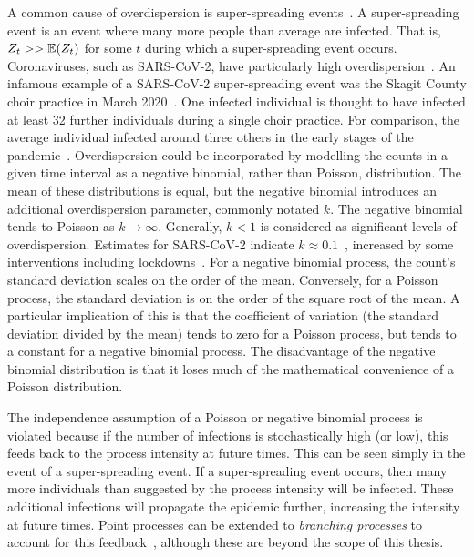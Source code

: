 \documentclass[thesis.tex]{subfiles}
\begin{document}
A common cause of overdispersion is super-spreading events~\autocite{lloyd-smithSuperspreading}.
A super-spreading event is an event where many more people than average are infected.
That is, $Z_t >> \operatorname{\mathbb{E}}(Z_t)$ for some $t$ during which a super-spreading event occurs.
Coronaviruses, such as SARS-CoV-2, have particularly high overdispersion~\autocites{endoEstimating}{adamClustering}{mccloskeySARS}.
An infamous example of a SARS-CoV-2 super-spreading event was the Skagit County choir practice in March 2020~\autocite{hamnerHigh}.
One infected individual is thought to have infected at least 32 further individuals during a single choir practice.
For comparison, the average individual infected around three others in the early stages of the pandemic~\autocite{pellisChallenges}. 
Overdispersion could be incorporated by modelling the counts in a given time interval as a negative binomial, rather than Poisson, distribution.
The mean of these distributions is equal, but the negative binomial introduces an additional overdispersion parameter, commonly notated $k$.
The negative binomial tends to Poisson as $k\to\infty$.
Generally, $k<1$ is considered as significant levels of overdispersion.
Estimates for SARS-CoV-2 indicate $k \approx 0.1$~\autocite{endoEstimating}, increased by some interventions including lockdowns~\autocites{quiltyReconstructing}{quiltyUnderstanding}.
For a negative binomial process, the count's standard deviation scales on the order of the mean.
Conversely, for a Poisson process, the standard deviation is on the order of the square root of the mean.
A particular implication of this is that the coefficient of variation (the standard deviation divided by the mean) tends to zero for a Poisson process, but tends to a constant for a negative binomial process.
The disadvantage of the negative binomial distribution is that it loses much of the mathematical convenience of a Poisson distribution.

The independence assumption of a Poisson or negative binomial process is violated because if the number of infections is stochastically high (or low), this feeds back to the process intensity at future times.
This can be seen simply in the event of a super-spreading event.
If a super-spreading event occurs, then many more individuals than suggested by the process intensity will be infected.
These additional infections will propagate the epidemic further, increasing the intensity at future times.
Point processes can be extended to \emph{branching processes} to account for this feedback~\autocite[246]{yanDistribution}, although these are beyond the scope of this thesis.
\end{document}
